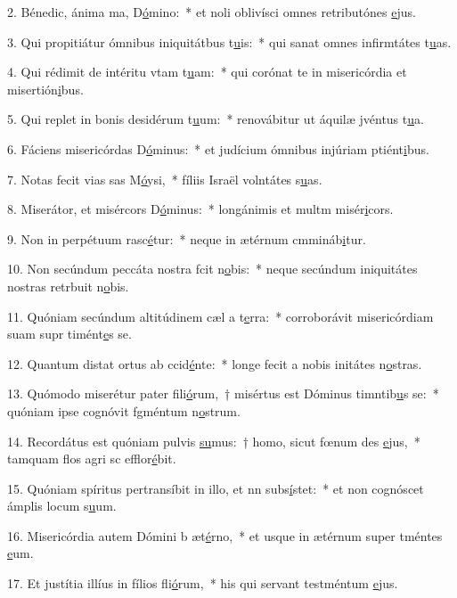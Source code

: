 2. Bénedic, ánima ma, D\uline{ó}mino:~* et noli oblivísci omnes retributónes \uline{e}jus.\par 
3. Qui propitiátur ómnibus iniquitátbus t\uline{u}is:~* qui sanat omnes infirmtátes t\uline{u}as.\par 
4. Qui rédimit de intéritu vtam t\uline{u}am:~* qui corónat te in misericórdia et misertión\uline{i}bus.\par 
5. Qui replet in bonis desidérum t\uline{u}um:~* renovábitur ut áquilæ jvéntus t\uline{u}a.\par 
6. Fáciens misericórdas D\uline{ó}minus:~* et judícium ómnibus injúriam ptiént\uline{i}bus.\par 
7. Notas fecit vias sas M\uline{ó}ysi,~* fíliis Israël volntátes s\uline{u}as.\par 
8. Miserátor, et misércors D\uline{ó}minus:~* longánimis et multm misér\uline{i}cors.\par 
9. Non in perpétuum rasc\uline{é}tur:~* neque in ætérnum cmmináb\uline{i}tur.\par 
10. Non secúndum peccáta nostra fcit n\uline{o}bis:~* neque secúndum iniquitátes nostras retrbuit n\uline{o}bis.\par 
11. Quóniam secúndum altitúdinem cæl a t\uline{e}rra:~* corroborávit misericórdiam suam supr timént\uline{e}s se.\par 
12. Quantum distat ortus ab ccid\uline{é}nte:~* longe fecit a nobis initátes n\uline{o}stras.\par 
13. Quómodo miserétur pater fili\uline{ó}rum,~† misértus est Dóminus timntib\uline{u}s se:~* quóniam ipse cognóvit fgméntum n\uline{o}strum.\par 
14. Recordátus est quóniam pulvis \uline{su}mus:~† homo, sicut fœnum des \uline{e}jus,~* tamquam flos agri sc efflor\uline{é}bit.\par 
15. Quóniam spíritus pertransíbit in illo, et nn subs\uline{í}stet:~* et non cognóscet ámplis locum s\uline{u}um.\par 
16. Misericórdia autem Dómini b æt\uline{é}rno,~* et usque in ætérnum super tméntes \uline{e}um.\par 
17. Et justítia illíus in fílios fli\uline{ó}rum,~* his qui servant testméntum \uline{e}jus.\par 
